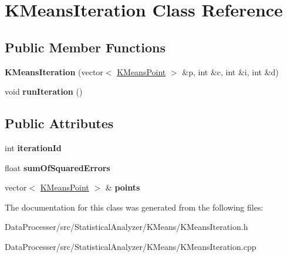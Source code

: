 \hypertarget{classKMeansIteration}{}\section{K\+Means\+Iteration Class Reference}
\label{classKMeansIteration}
\subsection*{Public Member Functions}
\begin{DoxyCompactItemize}
\item 
\mbox{\label{classKMeansIteration_ae7a7ca3c1427be0969b5288548c41276}} 
{\bfseries K\+Means\+Iteration} (vector$<$ \hyperlink{classKMeansPoint}{K\+Means\+Point} $>$ \&p, int \&c, int \&i, int \&d)
\item 
\mbox{\label{classKMeansIteration_a435bf71c49dbc0bd497a1992eb1baf57}} 
void {\bfseries run\+Iteration} ()
\end{DoxyCompactItemize}
\subsection*{Public Attributes}
\begin{DoxyCompactItemize}
\item 
\mbox{\label{classKMeansIteration_a2ba45f8286e6058129d67fe19df9f0e1}} 
int {\bfseries iteration\+Id}
\item 
\mbox{\label{classKMeansIteration_a1923907afbb2aead6b207b9a83998599}} 
float {\bfseries sum\+Of\+Squared\+Errors}
\item 
\mbox{\label{classKMeansIteration_a7feea077fbea8ad241a42d924e0f8cc7}} 
vector$<$ \hyperlink{classKMeansPoint}{K\+Means\+Point} $>$ \& {\bfseries points}
\end{DoxyCompactItemize}


The documentation for this class was generated from the following files\+:\begin{DoxyCompactItemize}
\item 
Data\+Processer/src/\+Statistical\+Analyzer/\+K\+Means/K\+Means\+Iteration.\+h\item 
Data\+Processer/src/\+Statistical\+Analyzer/\+K\+Means/K\+Means\+Iteration.\+cpp\end{DoxyCompactItemize}
